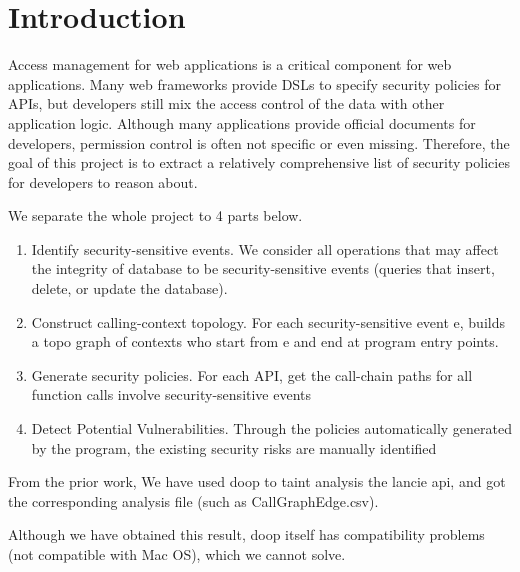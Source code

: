 \section{Introduction}%


Access management for web applications is a critical component for web
applications.
Many web frameworks provide DSLs to specify security policies for APIs, but
developers still mix the access control of the data with other application
logic.
Although many applications provide official documents for developers,
permission control is often not specific or even missing.
%
Therefore, the goal of this project is to extract a relatively comprehensive
list of security policies for developers to reason about.

We separate the whole project to 4 parts below.
\begin{enumerate}
  \item Identify security-sensitive events. We consider all operations that may
        affect the integrity of database to be security-sensitive events
        (queries that insert, delete, or update the database).

  \item Construct calling-context topology. For each security-sensitive event e,
        builds a topo graph of contexts who start from e and end at program
        entry points.

  \item Generate security policies. For each API,  get the call-chain paths for
        all function calls involve security-sensitive events

  \item Detect Potential Vulnerabilities. Through the policies automatically
        generated by the program, the existing security risks are manually
        identified
\end{enumerate}

From the prior work, We have used doop to taint analysis the lancie api, and got
the corresponding analysis file (such as CallGraphEdge.csv).

Although we have obtained this result, doop itself has compatibility problems
(not compatible with Mac OS), which we cannot solve.

